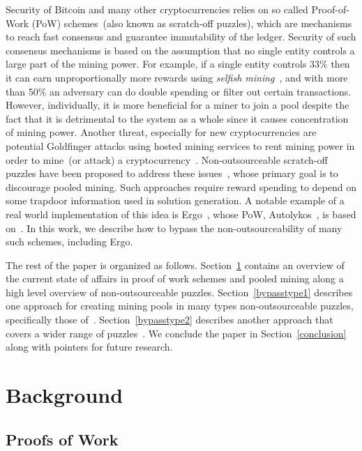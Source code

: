 \documentclass[runningheads]{llncs}
\newcommand{\powname}{Autolykos\xspace}
\begin{document}
Security of Bitcoin and many other cryptocurrencies relies on so called Proof-of-Work (PoW) schemes~(also known as scratch-off puzzles), which are mechanisms to reach fast consensus and guarantee immutability of the ledger. Security of such consensus mechanisms is based on the assumption that no single entity controls a large part of the mining power. For example, if a single entity controls
33\% then it can earn unproportionally more rewards using {\em selfish mining}~\cite{selfish}, and with more than 50\% an adversary can do double spending or filter out certain transactions. However,  individually, it is more beneficial for a miner to join a pool despite the fact that it is detrimental to the system as a whole since it causes concentration of mining power. Another threat, especially for new cryptocurrencies are potential Goldfinger attacks using hosted mining services to rent mining power in order to mine~(or attack) a cryptocurrency~\cite{goldfinger}. Non-outsourceable scratch-off puzzles have been proposed to address these issues~\cite{miller2015nonoutsourceable,daian2017short}, whose primary goal is to discourage pooled mining. Such approaches require reward spending to depend on some trapdoor information used in solution generation. A notable example of a real world implementation of this idea is Ergo~\cite{ergo}, whose PoW, \powname~\cite{autolykos}, is based on~\cite{daian2017short}. In this work, we describe how to bypass the non-outsourceability of many such schemes, including Ergo.

The rest of the paper is organized as follows. Section~\ref{background} contains an overview of the current state of affairs in proof of work schemes and pooled mining along a high level overview of non-outsourceable puzzles. Section~\ref{bypasstype1} describes one approach for creating mining pools in many types non-outsourceable puzzles, specifically those of~\cite{daian2017short}. Section~\ref{bypasstype2} describes another approach that covers a wider range of puzzles~\cite{daian2017short,miller2015nonoutsourceable}. We conclude the paper in Section~\ref{conclusion} along with pointers for future research.
\section{Background}
\label{background}
\subsection{Proofs of Work} 
\end{document}
